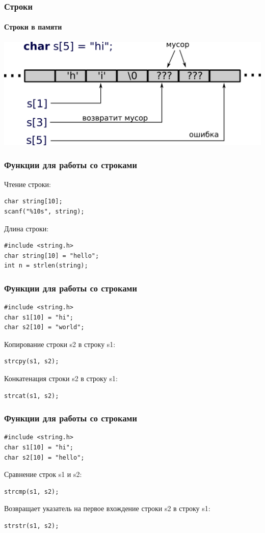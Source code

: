 \documentclass[14pt,pdf,hyperref={unicode}]{beamer}
\begin{document}
\begin{frame}[fragile]
\frametitle{Строки} 
\framesubtitle{Строки в памяти}
\begin{center}
\includegraphics[width=0.95\linewidth]{images/string_in_memory.png}
\end{center}
\end{frame}

\begin{frame}[fragile]
\frametitle{Функции для работы со строками} 
Чтение строки:
\begin{lstlisting}
char string[10];
scanf("%10s", string);
\end{lstlisting}
Длина строки:
\begin{lstlisting}
#include <string.h>
char string[10] = "hello";
int n = strlen(string);
\end{lstlisting}
\end{frame}

\begin{frame}[fragile]
\frametitle{Функции для работы со строками} 
\begin{lstlisting}
#include <string.h>
char s1[10] = "hi";
char s2[10] = "world";
\end{lstlisting}
Копирование строки s2 в строку s1:
\begin{lstlisting}
strcpy(s1, s2);
\end{lstlisting}
Конкатенация строки s2 в строку s1:
\begin{lstlisting}
strcat(s1, s2);
\end{lstlisting}
\end{frame}

\begin{frame}[fragile]
\frametitle{Функции для работы со строками} 
\begin{lstlisting}
#include <string.h>
char s1[10] = "hi";
char s2[10] = "hello";
\end{lstlisting}
Сравнение строк s1 и s2:
\begin{lstlisting}
strcmp(s1, s2);
\end{lstlisting}
Возвращает указатель на первое вхождение строки s2 в строку s1:
\begin{lstlisting}
strstr(s1, s2);
\end{lstlisting}
\end{frame}
\end{document}
